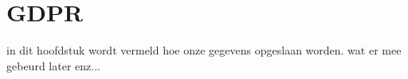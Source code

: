 \chapter{GDPR}
\label{ch:GDPR}
in dit hoofdstuk wordt vermeld hoe onze gegevens opgeslaan worden.
wat er mee gebeurd later enz...